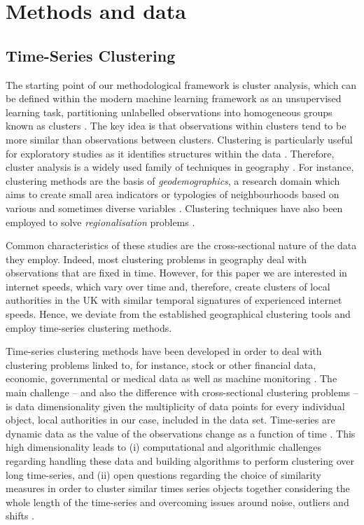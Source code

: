 \documentclass[Royal,times,sageh]{sagej}
\begin{document}
\hypertarget{sec:3}{%
\section{Methods and data}\label{sec:3}}

\hypertarget{sec:3.1}{%
\subsection{Time-Series Clustering}\label{sec:3.1}}

The starting point of our methodological framework is cluster analysis,
which can be defined within the modern machine learning framework as an
unsupervised learning task, partitioning unlabelled observations into
homogeneous groups known as clusters \citep{montero2014tsclust}. The key
idea is that observations within clusters tend to be more similar than
observations between clusters. Clustering is particularly useful for
exploratory studies as it identifies structures within the data
\citep{aghabozorgi2015time}. Therefore, cluster analysis is a widely
used family of techniques in geography
\citep{gordon1977classification, everitt1974cluster}. For instance,
clustering methods are the basis of \emph{geodemographics}, a research
domain which aims to create small area indicators or typologies of
neighbourhoods based on various and sometimes diverse variables
\citep{SINGLETON2009289, harris2005geodemographics}. Clustering
techniques have also been employed to solve \emph{regionalisation}
problems \citep{niesterowicz2016}.

Common characteristics of these studies are the cross-sectional nature
of the data they employ. Indeed, most clustering problems in geography
deal with observations that are fixed in time. However, for this paper
we are interested in internet speeds, which vary over time and,
therefore, create clusters of local authorities in the UK with similar
temporal signatures of experienced internet speeds. Hence, we deviate
from the established geographical clustering tools and employ
time-series clustering methods.

Time-series clustering methods have been developed in order to deal with
clustering problems linked to, for instance, stock or other financial
data, economic, governmental or medical data as well as machine
monitoring
\citep{aggarwal2013time, aggarwal2001surprising, hyndman2015large, WARRENLIAO20051857}.
The main challenge -- and also the difference with cross-sectional
clustering problems -- is data dimensionality given the multiplicity of
data points for every individual object, local authorities in our case,
included in the data set. Time-series are dynamic data as the value of
the observations change as a function of time
\citep{aghabozorgi2015time}. This high dimensionality leads to (i)
computational and algorithmic challenges regarding handling these data
and building algorithms to perform clustering over long time-series, and
(ii) open questions regarding the choice of similarity measures in order
to cluster similar times series objects together considering the whole
length of the time-series and overcoming issues around noise, outliers
and shifts \citep{lin2004iterative, aghabozorgi2015time}.
\end{document}
